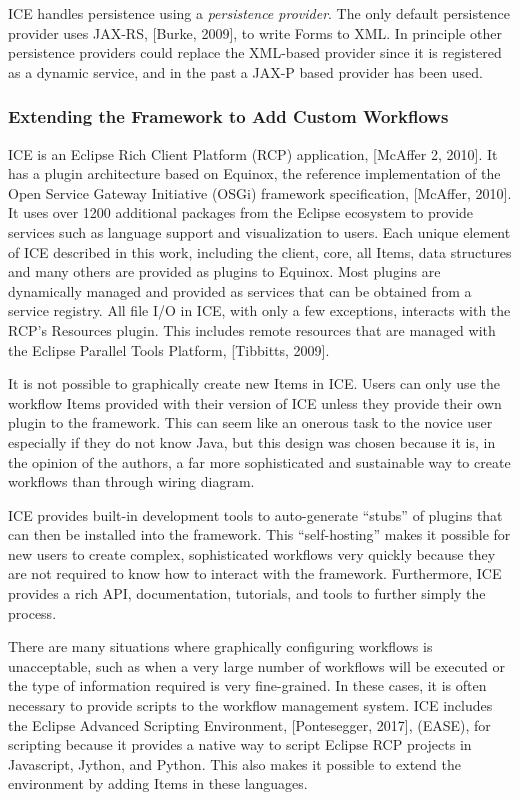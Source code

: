 ICE handles persistence using a \emph{persistence provider}. The only
default persistence provider uses JAX-RS, {[}Burke, 2009{]}, to write
Forms to XML. In principle other persistence providers could replace the
XML-based provider since it is registered as a dynamic service, and in
the past a JAX-P based provider has been used.

\subsubsection{Extending the Framework to Add Custom
Workflows}\label{extending-the-framework-to-add-custom-workflows}

ICE is an Eclipse Rich Client Platform (RCP) application, {[}McAffer 2,
2010{]}. It has a plugin architecture based on Equinox, the reference
implementation of the Open Service Gateway Initiative (OSGi) framework
specification, {[}McAffer, 2010{]}. It uses over 1200 additional
packages from the Eclipse ecosystem to provide services such as language
support and visualization to users. Each unique element of ICE described
in this work, including the client, core, all Items, data structures and
many others are provided as plugins to Equinox. Most plugins are
dynamically managed and provided as services that can be obtained from a
service registry. All file I/O in ICE, with only a few exceptions,
interacts with the RCP's Resources plugin. This includes remote
resources that are managed with the Eclipse Parallel Tools Platform,
{[}Tibbitts, 2009{]}.

It is not possible to graphically create new Items in ICE. Users can
only use the workflow Items provided with their version of ICE unless
they provide their own plugin to the framework. This can seem like an
onerous task to the novice user especially if they do not know Java, but
this design was chosen because it is, in the opinion of the authors, a
far more sophisticated and sustainable way to create workflows than
through wiring diagram.

ICE provides built-in development tools to auto-generate ``stubs'' of
plugins that can then be installed into the framework. This
``self-hosting'' makes it possible for new users to create complex,
sophisticated workflows very quickly because they are not required to
know how to interact with the framework. Furthermore, ICE provides a
rich API, documentation, tutorials, and tools to further simply the
process.

There are many situations where graphically configuring workflows is
unacceptable, such as when a very large number of workflows will be
executed or the type of information required is very fine-grained. In
these cases, it is often necessary to provide scripts to the workflow
management system. ICE includes the Eclipse Advanced Scripting
Environment, {[}Pontesegger, 2017{]}, (EASE), for scripting because it
provides a native way to script Eclipse RCP projects in Javascript,
Jython, and Python. This also makes it possible to extend the
environment by adding Items in these languages.

